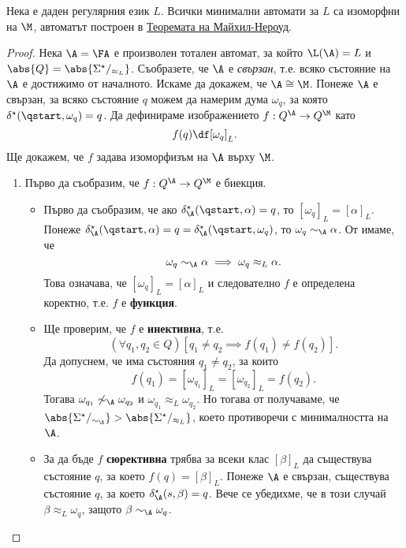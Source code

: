 \begin{framed}
  \begin{thm}
    Нека е даден регулярния език $L$.
    Всички минимални автомати за $L$ са изоморфни на $\M$, автоматът построен в \hyperref[th:myhill-nerode]{Теоремата на Майхил-Нероуд}.
  \end{thm}  
\end{framed}
\begin{proof}
  Нека $\A = \FA$ е произволен тотален автомат, за който $\L(\A) = L$ и $\abs{Q} = \abs{\Sigma^\star/_{\approx_L}}$.
  Съобразете, че $\A$ е {\em свързан}, т.е. всяко състояние на $\A$ е достижимо от началното.
  Искаме да докажем, че $\A \cong \M$.
  Понеже $\A$ е свързан, за всяко състояние $q$ можем да намерим дума $\omega_q$,
  за която $\delta^\star(\qstart,\omega_q) = q$.
  Да дефинираме изображението $f:Q^\A\to Q^\M$ като 
  \[f(q) \df [\omega_q]_L.\]
  Ще докажем, че $f$ задава изоморфизъм на $\A$ върху $\M$. 
  \begin{enumerate}[(1)]
  \item
    Първо да съобразим, че $f:Q^\A \to Q^\M$ е биекция.
    \begin{itemize}
    \item
      Първо да съобразим, че ако $\delta^\star_\A(\qstart,\alpha) = q$, то $[\omega_q]_L = [\alpha]_L$.
      Понеже $\delta^\star_\A(\qstart,\alpha) = q = \delta^\star_\A(\qstart,\omega_q)$, то $\omega_q \sim_\A \alpha$.
      От  имаме, че
      \[\omega_q \sim_\A \alpha \implies \omega_q \approx_L \alpha.\]
      Това означава, че $[\omega_q]_L = [\alpha]_L$ и следователно $f$ е определена коректно, т.е. $f$ е {\bf функция}.
    \item
      Ще проверим, че $f$ е {\bf инективна}, т.е.
      \[(\forall q_1,q_2 \in Q)[q_1\neq q_2 \implies f(q_1) \neq f(q_2)].\]
      Да допуснем, че има състояния $q_1 \neq q_2$, за които 
      \[f(q_1) = [\omega_{q_1}]_L = [\omega_{q_2}]_L = f(q_2).\]
      Тогава $\omega_{q_1} \not\sim_\A \omega_{q_2}$ и $\omega_{q_1} \approx_L \omega_{q_2}$.
      Но тогава от  получаваме, че $\abs{\Sigma^\star/_{\sim_\A}} > \abs{\Sigma^\star/_{\approx_L}}$,
      което противоречи с минималността на $\A$.
    \item
      За да бъде $f$ {\bf сюрективна} трябва за всеки клас $[\beta]_L$ да съществува състояние $q$, за което $f(q) = [\beta]_L$.
      Понеже $\A$ е свързан, съществува състояние $q$, за което $\delta^\star_\A(s,\beta) = q$.
      Вече се убедихме, че в този случай $\beta \approx_L \omega_q$, защото $\beta \sim_\A \omega_q$.

\end{itemize}
\end{enumerate}
\end{proof}
